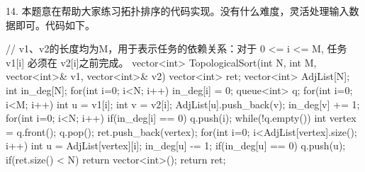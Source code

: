 \vspace{\baselineskip}

14. 本题意在帮助大家练习拓扑排序的代码实现。没有什么难度，灵活处理输入数据即可。代码如下。
\begin{cppcode}
    // v1、v2的长度均为M，用于表示任务的依赖关系：对于 0 <= i <= M, 任务 v1[i] 必须在 v2[i]之前完成。
    vector<int> TopologicalSort(int N, int M, vector<int>& v1, vector<int>& v2) {
        vector<int> ret;
        vector<int> AdjList[N];
        int in_deg[N];
        for(int i=0; i<N; i++) {
            in_deg[i] = 0;
        }
        queue<int> q;
        for(int i=0; i<M; i++) {
            int u = v1[i];
            int v = v2[i];
            AdjList[u].push_back(v);
            in_deg[v] += 1;
        }
        for(int i=0; i<N; i++) {
            if(in_deg[i] == 0) {
                q.push(i);
            }
        }
        while(!q.empty()) {
            int vertex = q.front();
            q.pop();
            ret.push_back(vertex);
            for(int i=0; i<AdjList[vertex].size(); i++) {
                int u = AdjList[vertex][i];
                in_deg[u] -= 1;
                if(in_deg[u] == 0) {
                    q.push(u);
                }
            }
        }
        if(ret.size() < N) {
            return vector<int>();
        }
        return ret;
    }
\end{cppcode}

\vspace{\baselineskip}

